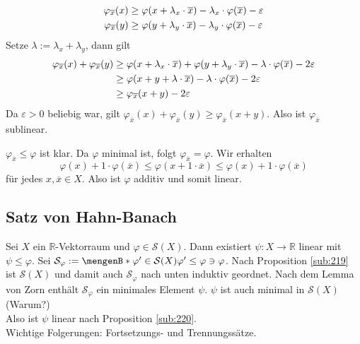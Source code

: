 \begin{description}
\begin{enumerate}[(i)]
\begin{align*}
			\varphi_{\overline{x}}(x) &\ge \varphi \enbrace*{x + \lambda_x \cdot \overline{x}} - \lambda_x \cdot \varphi(\overline{x}) - \varepsilon \\
			\varphi_{\overline{x}}(y) &\ge \varphi \enbrace*{y + \lambda_y \cdot \overline{x}} - \lambda_y \cdot \varphi(\overline{x}) - \varepsilon 
		\end{align*}
		Setze $\lambda  := \lambda_x + \lambda_y$, dann gilt
		\begin{align*}
			\varphi_{\overline{x}}(x) + \varphi_{\overline{x}}(y) &\ge \varphi \enbrace*{ x+ \lambda_x \cdot \overline{x}} + 
			\varphi \enbrace*{y+ \lambda_y \cdot \overline{x} } - \lambda  \cdot \varphi(\overline{x}) - 2 \varepsilon \\
			&\ge  \varphi \enbrace*{x +y + \lambda \cdot \overline{x}} - \lambda  \cdot \varphi(\overline{x}) - 2 \varepsilon \\
			&\ge \varphi_{\overline{x}} (x+y) - 2 \varepsilon
		\end{align*}
		Da $\varepsilon>0$ beliebig war, gilt $\varphi_{\overline{x}}(x) + \varphi_{\overline{x}}(y) \ge \varphi_{\overline{x}}(x+y)$. Also ist $\varphi_{\overline{x}}$
		sublinear.
	\end{enumerate}
	$\varphi_{\overline{x}} \le \varphi$ ist klar. Da $\varphi$ minimal ist, folgt $\varphi_{\overline{x}} = \varphi$. Wir erhalten 
	\[
		\varphi(x) + 1 \cdot \varphi(\overline{x}) \le \varphi(x+ 1 \cdot \overline{x}) \le \varphi(x) + 1 \cdot \varphi(\overline{x})
	\]
	für jedes $x, \overline{x}\in X$. Also ist $\varphi$ additiv und somit linear. \bewende
\end{description}

\subsection{Satz von Hahn-Banach} %
\label{sub:221}
Sei $X$ ein $\mathds{R}$-Vektorraum und $\varphi \in \mathcal{S}(X)$.
Dann existiert $\psi : X \to \mathds{R}$ linear mit $\psi \le \varphi$.
Sei $\mathcal{S}_\varphi : =\set[\varphi' \in \mathcal{S}(X)]{\varphi' \le \varphi} \ni \varphi$. Nach Proposition \ref{sub:219} ist $\mathcal{S}(X)$ und damit auch 
$\mathcal{S}_\varphi$ nach unten induktiv geordnet. Nach dem Lemma von Zorn enthält $\mathcal{S}_\varphi$ ein minimales Element $\psi$. $\psi$ ist auch minimal in 
$\mathcal{S}(X)$ \hfill (Warum?)\\
Also ist $\psi$ linear nach Proposition \ref{sub:220}. \bewende \medskip \\
Wichtige Folgerungen: Fortsetzungs- und Trennungssätze.

